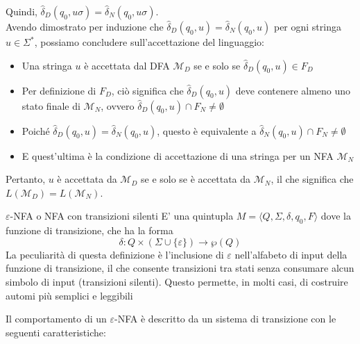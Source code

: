 \documentclass[12pt, a4paper]{report}
\begin{document}
\begin{demonstration}
\begin{itemize}
                    \end{itemize}
                    Quindi, $\hat{\delta}_D({q_0}, u\sigma) = \hat{\delta}_N(q_0, u\sigma)$.\\
                    Avendo dimostrato per induzione che $\hat{\delta}_D({q_0}, u) = \hat{\delta}_N(q_0, u)$ per ogni stringa $u \in \Sigma^*$, possiamo concludere sull'accettazione del linguaggio:
                    \begin{itemize}
                        \item Una stringa $u$ è accettata dal DFA $\mathcal{M}_D$ se e solo se $\hat{\delta}_D({q_0}, u) \in F_D$
                        \item Per definizione di $F_D$, ciò significa che $\hat{\delta}_D({q_0}, u)$ deve contenere almeno uno stato finale di $\mathcal{M}_N$, ovvero $\hat{\delta}_D({q_0}, u) \cap F_N \neq \emptyset$
                        \item Poiché $\hat{\delta}_D({q_0}, u) = \hat{\delta}_N(q_0, u)$, questo è equivalente a $\hat{\delta}_N(q_0, u) \cap F_N \neq \emptyset$
                        \item E quest'ultima è la condizione di accettazione di una stringa per un NFA $\mathcal{M}_N$
                    \end{itemize}
                    Pertanto, $u$ è accettata da $\mathcal{M}_D$ se e solo se è accettata da $\mathcal{M}_N$, il che significa che $L(\mathcal{M}_D) = L(\mathcal{M}_N)$.
                \end{demonstration}
                \begin{definitionbox}{$\varepsilon$-NFA o NFA con transizioni silenti}{}
                    E' una quintupla $M = \langle Q, \Sigma, \delta, q_0, F \rangle$ dove la funzione di transizione, che ha la forma \begin{equation*}
                        \delta : Q \times (\Sigma \cup \{\varepsilon\}) \to \wp(Q)
                    \end{equation*}
                    La peculiarità di questa definizione è l'inclusione di $\varepsilon$ nell'alfabeto di input della funzione di transizione, il che consente transizioni tra stati senza consumare alcun simbolo di input (transizioni silenti). Questo permette, in molti casi, di costruire automi più semplici e leggibili
                \end{definitionbox}
                Il comportamento di un $\varepsilon$-NFA è descritto da un sistema di transizione con le seguenti caratteristiche:
\end{document}
